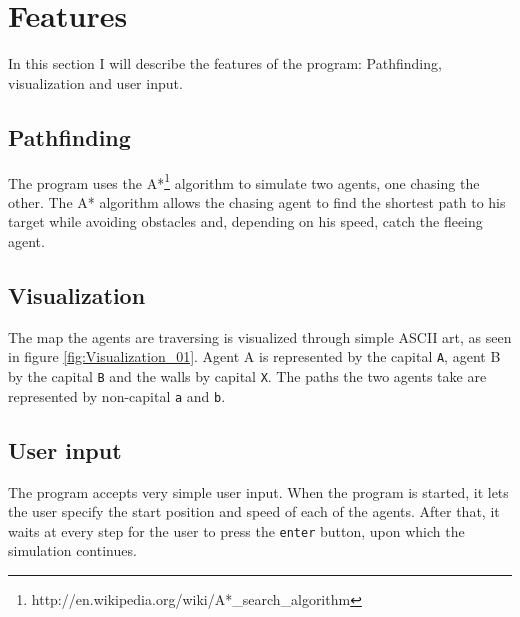 \section{Features}
\label{02}

In this section I will describe the features of the program: Pathfinding, visualization and user input.

\subsection{Pathfinding}
\label{02_01}

The program uses the A*\footnote{http://en.wikipedia.org/wiki/A*\_search\_algorithm} algorithm to simulate two agents, one chasing the other. The A* algorithm allows the chasing agent to find the shortest path to his target while avoiding obstacles and, depending on his speed, catch the fleeing agent.

\subsection{Visualization}
\label{02_02}

The map the agents are traversing is visualized through simple ASCII art, as seen in figure \ref{fig:Visualization_01}. Agent A is represented by the capital \texttt{A}, agent B by the capital \texttt{B} and the walls by capital \texttt{X}. The paths the two agents take are represented by non-capital \texttt{a} and \texttt{b}.


\subsection{User input}
\label{02_03}

The program accepts very simple user input. When the program is started, it lets the user specify the start position and speed of each of the agents. After that, it waits at every step for the user to press the \texttt{enter} button, upon which the simulation continues.